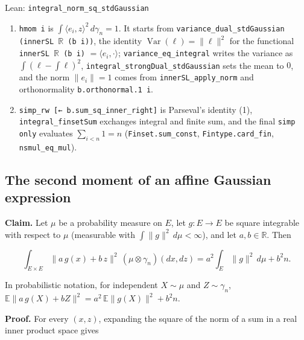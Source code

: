 \documentclass[11pt,a4paper]{report}
\begin{document}
\begin{leanbox}{Lean: \texttt{integral\_\allowbreak{}norm\_\allowbreak{}sq\_\allowbreak{}stdGaussian}}
\begin{enumerate}
\item \texttt{hmom i} is \(\int\langle e_i,z\rangle^2\,d\gamma_n=1\). It starts from \texttt{variance\_\allowbreak{}dual\_\allowbreak{}std\allowbreak{}Gaussian (inner\allowbreak{}SL \ensuremath{\mathbb R} (b i))}, the identity \(\operatorname{Var}(\ell)=\|\ell\|^2\) for the functional \texttt{inner\allowbreak{}SL \ensuremath{\mathbb R} (b i)} \(=\langle e_i,\cdot\rangle\); \texttt{variance\_\allowbreak{}eq\_\allowbreak{}integral} writes the variance as \(\int(\ell-\int\ell)^2\), \texttt{integral\_\allowbreak{}strong\allowbreak{}Dual\_\allowbreak{}std\allowbreak{}Gaussian} sets the mean to \(0\), and the norm \(\|e_i\|=1\) comes from \texttt{inner\allowbreak{}SL\_\allowbreak{}apply\_\allowbreak{}norm} and orthonormality \texttt{b.\allowbreak{}orthonormal.\allowbreak{}1 i}.

\item \texttt{simp\_\allowbreak{}rw [← b.\allowbreak{}sum\_\allowbreak{}sq\_\allowbreak{}inner\_\allowbreak{}right]} is Parseval's identity (1), \texttt{integral\_\allowbreak{}finset\allowbreak{}Sum} exchanges integral and finite sum, and the final \texttt{simp only} evaluates \(\sum_{i<n}1=n\) (\texttt{Finset.\allowbreak{}sum\_\allowbreak{}const}, \texttt{Fintype.\allowbreak{}card\_\allowbreak{}fin}, \texttt{nsmul\_\allowbreak{}eq\_\allowbreak{}mul}).

\end{enumerate}
\end{leanbox}
\subsection{\texorpdfstring{The second moment of an affine Gaussian expression}{The second moment of an affine Gaussian expression}}
\label{report-step-UnadjustedLangevin-LSI-GaussianDrift-lean-2}


\textbf{Claim.} Let \(\mu\) be a probability measure on \(E\), let \(g:E\to E\) be square integrable with respect to \(\mu\) (measurable with \(\int\|g\|^2\,d\mu<\infty\)), and let \(a,b\in\mathbb R\). Then


\[\int_{E\times E}\|a\,g(x)+b\,z\|^2\,(\mu\otimes\gamma_n)(dx,dz)=a^2\int_E\|g\|^2\,d\mu+b^2n.\]


In probabilistic notation, for independent \(X\sim\mu\) and \(Z\sim\gamma_n\), \(\mathbb E\|a\,g(X)+bZ\|^2=a^2\,\mathbb E\|g(X)\|^2+b^2n\).




\textbf{Proof.} For every \((x,z)\), expanding the square of the norm of a sum in a real inner product space gives
\end{document}
